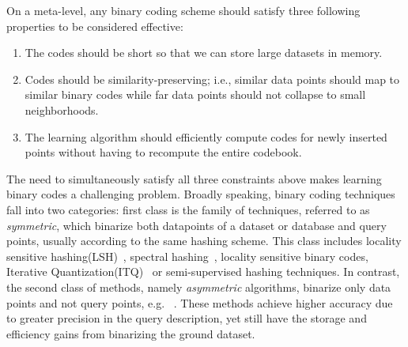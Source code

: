 \documentclass{sig-alternate}
\begin{document}
On a meta-level, any binary coding scheme should satisfy three following properties to be considered effective: 
\begin{enumerate}
\item{The codes should be short so that we can store large datasets in memory.}
\item{Codes should be similarity-preserving; i.e., similar data points should map to similar binary codes while far data points should not collapse to small neighborhoods.}
\item{The learning algorithm should efficiently compute codes for newly inserted points without having to recompute the entire codebook.}
\end{enumerate}
The need to simultaneously satisfy all three constraints above makes learning binary codes a challenging problem.
Broadly speaking, binary coding techniques fall into two categories: first class is the family of techniques, referred to as \textit{symmetric}, which binarize both datapoints of a dataset or database and query points, usually according to the same hashing scheme. This class includes locality sensitive hashing(LSH)~\cite{indyk1998approximate}, spectral hashing~\cite{weiss2009spectral}, 
locality sensitive binary codes\cite{raginsky2009locality}, Iterative Quantization(ITQ)~\cite{gong2011iterative} or semi-supervised hashing\cite{wang2012semi} techniques.
In contrast, the second class of methods, namely \emph{asymmetric} algorithms, binarize only data points and not query points, e.g. ~\cite{jegou2011product,dong2008asymmetric,gordo2014asymmetric,jegou2010aggregating}. These methods achieve higher accuracy due to greater precision in the query description, yet still have the storage and efficiency gains from binarizing the ground dataset.
\end{document}
